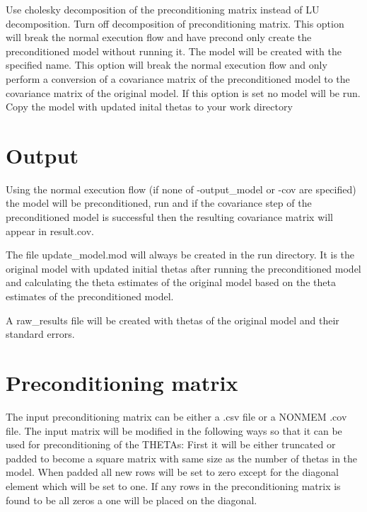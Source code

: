 \begin{optionlist}
Use cholesky decomposition of the preconditioning matrix instead of LU decomposition.
Turn off decomposition of preconditioning matrix.
This option will break the normal execution flow and have precond only create the preconditioned model without running it.
The model will be created with the specified name.
This option will break the normal execution flow and only perform a conversion of a covariance matrix of the preconditioned model to the covariance matrix of the original model.
If this option is set no model will be run.
Copy the model with updated inital thetas to your work directory
\end{optionlist}

\section{Output}

Using the normal execution flow (if none of -output\_model or -cov are specified) the model will be preconditioned, run and if the covariance step of the preconditioned model is successful then the resulting covariance matrix will appear in result.cov.

The file update\_model.mod will always be created in the run directory. It is the original model with updated initial thetas after
running the preconditioned model and calculating the theta estimates of the original model based on the theta estimates of the preconditioned model.

A raw\_results file will be created with thetas of the original model and their standard errors.

\section{Preconditioning matrix}

The input preconditioning matrix can be either a .csv file or a NONMEM .cov file. The input matrix will be modified in the following ways so that it can be used for preconditioning of the THETAs:
First it will be either truncated or padded to become a square matrix with same size as the number of thetas in the model.
When padded all new rows will be set to zero except for the diagonal element which will be set to one. If any rows in the preconditioning matrix is found
to be all zeros a one will be placed on the diagonal.

